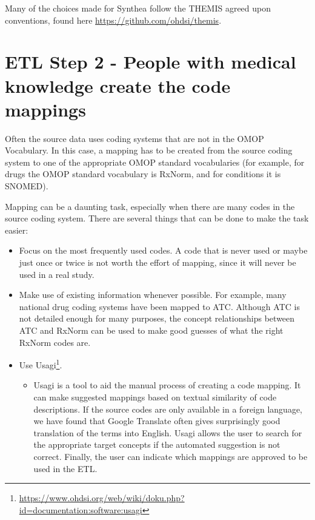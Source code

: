 \documentclass[11pt]{book}
\providecommand{\tightlist}{%
  \setlength{\itemsep}{0pt}\setlength{\parskip}{0pt}}
\let\rmarkdownfootnote\footnote%
\def\footnote{\protect\rmarkdownfootnote}
\theoremstyle{definition}
\theoremstyle{definition}
\theoremstyle{definition}
\theoremstyle{remark}
\begin{document}
Many of the choices made for Synthea follow the THEMIS agreed upon conventions, found here \url{https://github.com/ohdsi/themis}.

\hypertarget{etl-step-2---people-with-medical-knowledge-create-the-code-mappings}{%
\section{ETL Step 2 - People with medical knowledge create the code mappings}\label{etl-step-2---people-with-medical-knowledge-create-the-code-mappings}}

Often the source data uses coding systems that are not in the OMOP Vocabulary. In this case, a mapping has to be created from the source coding system to one of the appropriate OMOP standard vocabularies (for example, for drugs the OMOP standard vocabulary is RxNorm, and for conditions it is SNOMED).

Mapping can be a daunting task, especially when there are many codes in the source coding system. There are several things that can be done to make the task easier:

\begin{itemize}
\tightlist
\item
  Focus on the most frequently used codes. A code that is never used or maybe just once or twice is not worth the effort of mapping, since it will never be used in a real study.
\item
  Make use of existing information whenever possible. For example, many national drug coding systems have been mapped to ATC. Although ATC is not detailed enough for many purposes, the concept relationships between ATC and RxNorm can be used to make good guesses of what the right RxNorm codes are.
\item
  Use Usagi\footnote{\url{https://www.ohdsi.org/web/wiki/doku.php?id=documentation:software:usagi}}.

  \begin{itemize}
  \tightlist
  \item
    Usagi is a tool to aid the manual process of creating a code mapping. It can make suggested mappings based on textual similarity of code descriptions. If the source codes are only available in a foreign language, we have found that Google Translate often gives surprisingly good translation of the terms into English. Usagi allows the user to search for the appropriate target concepts if the automated suggestion is not correct. Finally, the user can indicate which mappings are approved to be used in the ETL.
  \end{itemize}
\end{itemize}
\end{document}
